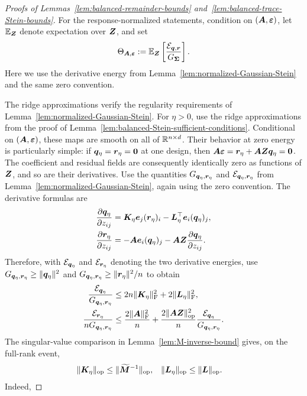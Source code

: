 \documentclass{article}
\theoremstyle{plain} %
\theoremstyle{definition} %
\theoremstyle{definition} %
\begin{document}
\begin{proof}[Proofs of Lemmas~\ref{lem:balanced-remainder-bounds}
and~\ref{lem:balanced-trace-Stein-bounds}]
For the response-normalized statements, condition on
$(\boldsymbol{A},{\boldsymbol{\varepsilon} })$, let ${\mathbb{E}}_{\boldsymbol{Z}}$ denote expectation over $\boldsymbol{Z}$, and set
\begin{align*}
    \Theta_{\boldsymbol{A},{\boldsymbol{\varepsilon} }}
    :={\mathbb{E}}_{\boldsymbol{Z}}\left[\frac{{\mathcal E}_{\boldsymbol{q},\boldsymbol{r}}}{G_{\boldsymbol{\Sigma}}}\right].
\end{align*}
Here we use the derivative energy from
Lemma~\ref{lem:normalized-Gaussian-Stein} and the same zero convention.

The ridge approximations verify the regularity requirements of
Lemma~\ref{lem:normalized-Gaussian-Stein}. For $\eta>0$, use the ridge
approximations from the proof of
Lemma~\ref{lem:balanced-Stein-sufficient-conditions}.
Conditional on $(\boldsymbol{A},{\boldsymbol{\varepsilon} })$, these maps are smooth on all of
${\mathbb{R}}^{n\times d}$. Their behavior at zero energy is particularly simple: if
$\boldsymbol{q}_\eta=\boldsymbol{r}_\eta=\mathbf{0}$ at one design, then
$\boldsymbol{A}{\boldsymbol{\varepsilon} }=\boldsymbol{r}_\eta+\boldsymbol{A}\boldsymbol{Z}\boldsymbol{q}_\eta=\mathbf{0}$. The coefficient and residual
fields are consequently identically zero as functions of $\boldsymbol{Z}$, and so are
their derivatives. Use the quantities
$G_{\boldsymbol{q}_\eta,\boldsymbol{r}_\eta}$ and ${\mathcal E}_{\boldsymbol{q}_\eta,\boldsymbol{r}_\eta}$ from
Lemma~\ref{lem:normalized-Gaussian-Stein}, again using the zero convention.
The derivative formulas are
\begin{align*}
    \pdv{\boldsymbol{q}_\eta}{z_{ij}}
    &=\boldsymbol{K}_\eta\boldsymbol{e}_j(\boldsymbol{r}_\eta)_i
      -\boldsymbol{L}_\eta^\top\boldsymbol{e}_i(\boldsymbol{q}_\eta)_j,\\
    \pdv{\boldsymbol{r}_\eta}{z_{ij}}
    &=-\boldsymbol{A}\boldsymbol{e}_i(\boldsymbol{q}_\eta)_j
      -\boldsymbol{A}\boldsymbol{Z}\pdv{\boldsymbol{q}_\eta}{z_{ij}}.
\end{align*}
Therefore, with ${\mathcal E}_{\boldsymbol{q}_\eta}$ and ${\mathcal E}_{\boldsymbol{r}_\eta}$ denoting the two
derivative energies, use
$G_{\boldsymbol{q}_\eta,\boldsymbol{r}_\eta}\geq\lVert\boldsymbol{q}_\eta\rVert^2$ and
$G_{\boldsymbol{q}_\eta,\boldsymbol{r}_\eta}\geq\lVert\boldsymbol{r}_\eta\rVert^2/n$ to obtain
\begin{align*}
    \frac{{\mathcal E}_{\boldsymbol{q}_\eta}}{G_{\boldsymbol{q}_\eta,\boldsymbol{r}_\eta}}
    &\leq 2n\lVert\boldsymbol{K}_\eta\rVert_{\rm F}^2
       +2\lVert\boldsymbol{L}_\eta\rVert_{\rm F}^2,\\
    \frac{{\mathcal E}_{\boldsymbol{r}_\eta}}{nG_{\boldsymbol{q}_\eta,\boldsymbol{r}_\eta}}
    &\leq \frac{2\lVert\boldsymbol{A}\rVert_{\rm F}^2}{n}
       +\frac{2\lVert\boldsymbol{A}\boldsymbol{Z}\rVert_{\rm op}^2}{n}
          \frac{{\mathcal E}_{\boldsymbol{q}_\eta}}{G_{\boldsymbol{q}_\eta,\boldsymbol{r}_\eta}}.
\end{align*}
The singular-value comparison in
Lemma~\ref{lem:M-inverse-bound} gives, on the full-rank event,
\begin{align*}
    \lVert\boldsymbol{K}_\eta\rVert_{\rm op}
       &\leq\lVert\widetilde{\boldsymbol{M}}^{-1}\rVert_{\rm op},
    &
    \lVert\boldsymbol{L}_\eta\rVert_{\rm op}
       &\leq\lVert\boldsymbol{L}\rVert_{\rm op}.
\end{align*}
Indeed,

\end{proof}
\end{document}
